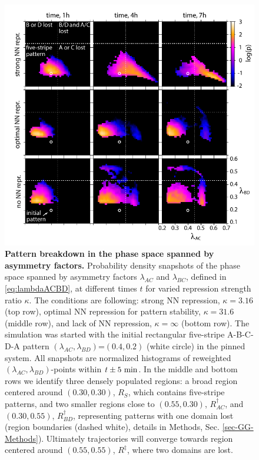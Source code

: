 \documentclass[a4paper,10pt]{article}
\newcommand{\GA}{A\xspace}
\newcommand{\GB}{B\xspace}
\newcommand{\GC}{C\xspace}
\newcommand{\GD}{D\xspace}
\newcommand{\unit}[1]{{\rm #1}}
\begin{document}

\begin{figure}[ht!]  
  \centering
  \includegraphics[width=\textwidth]{Figures/FigurePhaseSpaceComicV5.pdf}
  \caption{\textbf{Pattern breakdown in the phase space spanned by asymmetry factors.}
      Probability density snapshots of the phase space spanned by asymmetry factors $\lambda_{AC}$ and $\lambda_{BC}$, defined in \eqref{eq:lambdaACBD}, 
      at different times $t$ for varied repression strength ratio $\kappa$. The conditions are following: strong NN repression, $\kappa=3.16$ (top row), optimal NN repression for pattern stability, $\kappa=31.6$ (middle row), and lack of NN repression, $\kappa=\infty$ (bottom row). The simulation was started with the initial rectangular five-stripe \GA-\GB-\GC-\GD-\GA pattern $(\lambda_{AC}, \lambda_{BD})$=$(0.4,0.2)$ (white circle) in the pinned system. All snapshots are normalized histograms of reweighted $(\lambda_{AC}, \lambda_{BD})$-points within $t\pm5~\unit{min}$.
      In the middle and bottom rows we identify three densely populated regions:
      a broad region centered around $(0.30,0.30)$, $R_S$, which contains five-stripe patterns,
      and two smaller regions close to $(0.55, 0.30)$, $R^\dagger_{AC}$, and $(0.30, 0.55)$, $R^\dagger_{BD}$,
      representing patterns with one domain lost (region boundaries (dashed white), details in Methods,  Sec. \ref{sec-GG-Methods}). Ultimately trajectories will converge towards region centered around $(0.55, 0.55)$, $R^\ddagger$, where two domains are lost. %
  \label{Fig-DensityPinned}
  }
\end{figure}
\end{document}
